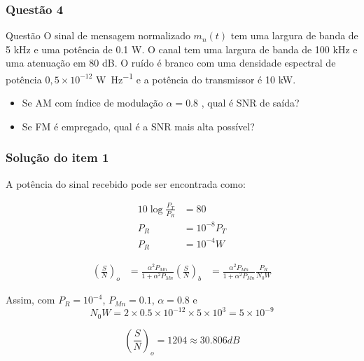 \documentclass{beamer}
\begin{document}
\begin{frame}
  \frametitle{Questão 4}

  \begin{block}{Questão}
    O sinal de mensagem normalizado $m_n(t)$ tem uma largura de banda de 
    5 \si{\kilo \hertz} e uma potência de 0.1 \si{\watt}. O canal tem uma largura 
    de banda de 100 \si{\kilo \hertz} e uma atenuação em 80 dB. O ruído é branco com
    uma densidade espectral de potência $0,5 \times 10^{-12}$ \si{\watt \per \hertz} e a potência do transmissor é 
    10 \si{\kilo \watt}.  

    \begin{itemize}
      \item Se AM com índice de modulação $\alpha = 0.8$ , qual é  SNR de saída?
      \item Se FM é empregado, qual é a SNR mais alta possível?
    \end{itemize}

  \end{block}
  
\end{frame}


\begin{frame}
  \frametitle{Solução do item 1}
   A potência do sinal recebido pode ser encontrada como: 

  \begin{align*}
  10\log{\frac{P_T}{P_R}} &= 80\\
  P_R &= 10^{-8}P_T\\
  P_R &= 10^{-4} W 
  \end{align*}
  
  
  \begin{align*}
  \left(\frac{S}{N}\right)_o &= \frac{ \alpha^2 P_{Mn}}{1 + \alpha^2 P_{Mn}} \left(\frac{S}{N}\right)_b
  &= \frac{ \alpha^2 P_{Mn}}{1 + \alpha^2 P_{Mn}} \frac{P_R}{N_0W}
  \end{align*}
  

  Assim, com $P_R = 10^{-4}$, $P_{Mn} = 0.1$, $\alpha = 0.8$ e $$N_0W = 2 \times 0.5 \times 10^{-12} \times 5 \times 10^3 = 5 \times 10^{-9}$$
\vspace*{-1cm}

$$ \left(\frac{S}{N}\right)_o = 1204 \approx 30.806 dB $$

\end{frame}
\end{document}
